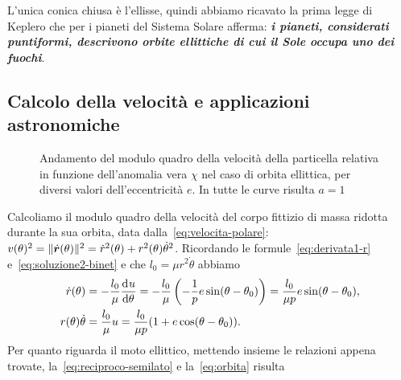 L'unica conica chiusa è l'ellisse, quindi abbiamo ricavato la prima legge di
Keplero che per i pianeti del Sistema Solare afferma: \textbf{\emph{i pianeti,
  considerati puntiformi, descrivono orbite ellittiche di cui il Sole occupa uno
  dei fuochi}}.

\subsection{Calcolo della velocità e applicazioni astronomiche}
\label{sec:velocita}
\begin{figure}
  \centering
  
  \caption[Andamento della velocità in funzione dell'anomalia vera]{Andamento
    del modulo quadro della velocità della particella relativa in funzione
    dell'anomalia vera $\chi$ nel caso di orbita ellittica, per diversi valori
    dell'eccentricità $e$. In tutte le curve risulta $a=1$}
  \label{fig:velocita}
\end{figure}
Calcoliamo il modulo quadro della velocità del corpo fittizio di massa ridotta
durante la sua orbita, data dalla~\eqref{eq:velocita-polare}: $v(\theta)^2 =
\lVert\dot{\bm{r}}(\theta)\rVert^2 = \dot{r}^2(\theta) +
r^2(\theta)\dot{\theta}^2$. Ricordando le formule~\eqref{eq:derivata1-r}
e~\eqref{eq:soluzione2-binet} e che $l_0=\mu r^2\dot{\theta}$ abbiamo
\begin{subequations}
  \begin{align}
    \dot{r}(\theta) &= -\frac{l_0}{\mu}\frac{{\mathop{}\!\mathrm{d}^{}}u}{\mathop{}\!\mathrm{d} {\theta}^{}} = -\frac{l_0}{\mu}
    \left( -\frac{1}{p}e\sin(\theta-\theta_0) \right) = \frac{l_0}{\mu p}e
    \sin(\theta -
    \theta_0), \label{eq:velocita-radiale}\\
    r(\theta)\dot{\theta} &= \frac{l_0}{\mu}u =
    \frac{l_0}{\mu p}(1+e\cos(\theta-\theta_0)). \label{eq:velocita-tangenziale}
  \end{align}
\end{subequations}
Per quanto riguarda il moto ellittico, mettendo insieme le relazioni appena
trovate, la~\eqref{eq:reciproco-semilato} e la~\eqref{eq:orbita} risulta
